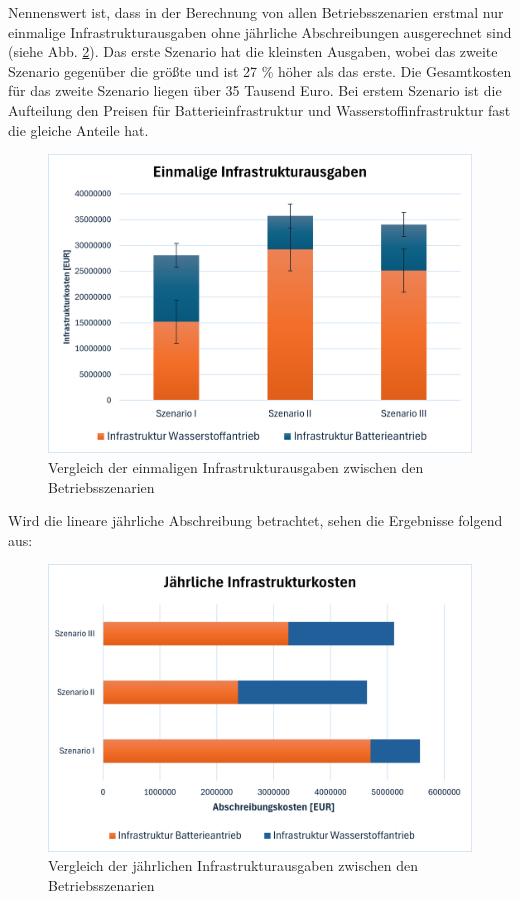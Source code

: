 Nennenswert ist, dass in der Berechnung von allen Betriebsszenarien erstmal nur einmalige Infrastrukturausgaben 
ohne jährliche Abschreibungen ausgerechnet sind (siehe Abb. \ref{res_betriebsszenarien}). 
Das erste Szenario hat die kleinsten Ausgaben, wobei das zweite Szenario gegenüber die größte und ist 27 \% höher als das erste.
Die Gesamtkosten für das zweite Szenario liegen über 35 Tausend Euro. %
Bei erstem Szenario ist die Aufteilung den Preisen für Batterieinfrastruktur und Wasserstoffinfrastruktur fast die gleiche Anteile hat.
\begin{figure}[h]
	\centering
	\includegraphics[width=0.8\linewidth]{Bilder/Infr_Szenarien.png}
	\caption[Vergleich der einmaligen Infrastrukturausgaben zwischen den Betriebsszenarien]{Vergleich der einmaligen Infrastrukturausgaben zwischen den Betriebsszenarien}
	\label{res_betriebsszenarien}
\end{figure}

Wird die lineare jährliche Abschreibung betrachtet, sehen die Ergebnisse folgend aus:
\begin{figure}[h]
	\centering
	\includegraphics[width=0.8\linewidth]{Bilder/infr_abschreibung.png}
	\caption[Vergleich der jährlichen Infrastrukturausgaben zwischen den Betriebsszenarien]{Vergleich der jährlichen Infrastrukturausgaben zwischen den Betriebsszenarien}
	\label{res_betriebsszenarien}
\end{figure}
